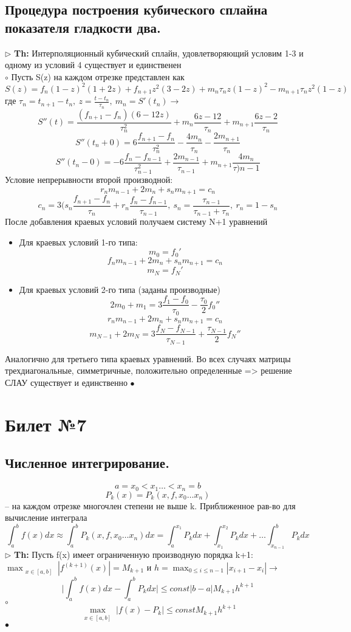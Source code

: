 \documentclass[a4paper]{article}
\begin{document}
\subsection{Процедура построения кубического сплайна показателя гладкости два.}
$\triangleright$ \textbf{Th:} Интерполяционный кубический сплайн, удовлетворяющий условим 1-3 и одному из условий 4 существует и единственен\\
	$\circ$ 
	Пусть S(z) на каждом отрезке представлен как 
	$$ S(z) = f_n(1-z)^2(1+2z) +f_{n+1}z^2(3-2z) + m_n\tau_nz(1-z)^2 -m_{n+1}\tau_nz^2(1-z)$$
	где $\tau_n = t_{n+1}-t_n, \ z = \frac{t-t_n}{\tau_n}, \ m_n = S'(t_n) \rightarrow$
	$$ S''(t) = \frac{(f_{n+1} - f_n)(6-12z)}{\tau_n^2} + m_n \frac{6z-12}{\tau_n} + m_{n+1} \frac{6z-2}{\tau_n}$$
	$$ S''(t_n+0) = 6 \frac{f_{n+1}-f_n}{\tau_n^2} - \frac{4m_n}{\tau_n} - \frac{2m_{n+1}}{\tau_n}$$
	$$ S''(t_n-0) = -6 \frac{f_n-f_{n-1}}{\tau_{n-1}^2} + \frac{2m_{n-1}}{\tau_{n-1}} + m_{n+1}\frac{4m_n}{\tau){n-1}}$$
	Условие непрерывности второй производной:
	$$r_nm_{n-1}+2m_n+s_nm_{n+1}=c_n$$
	$$ c_n=3 \big(s_n\frac{f_{n+1}-f_n}{\tau_n}+r_n\frac{f_n-f_{n-1}}{\tau_{n-1}}, \ s_n=\frac{\tau_{n-1}}{\tau_{n-1}+\tau_n},\ r_n=1-s_n$$
	После добавления краевых условий получаем систему N+1 уравнений
	\begin{itemize}
		\item Для краевых условий 1-го типа:
		$$ m_0=f_0'$$
		$$ f_nm_{n-1} + 2m_n + s_nm_{n+1} = c_n$$
		$$ m_N=f_N'$$
		\item Для краевых условий 2-го типа (заданы производные)
		$$ 2m_0 + m_1 = 3\frac{f_1-f_0}{\tau_0} - \frac{\tau_0}{2}f_0'' $$
		$$ r_nm_{n-1} + 2m_n + s_nm_{n+1} = c_n $$
		$$ m_{N-1} + 2m_N = 3\frac{f_N-f_{N-1}}{\tau_{N-1}} + \frac{\tau_{N-1}}{2}f_N'' $$
	\end{itemize}
	Аналогично для третьего типа краевых уравнений. Во всех случаях матрицы трехдиагональные, симметричные, положительно определенные => решение СЛАУ существует и единственно
	$\bullet$

\section{Билет №7}
\subsection{Численное интегрирование.}
$$a=x_0<x_1\ldots <x_n=b$$
$$P_k(x)=P_k(x,f,x_0 \ldots x_n)$$ – на каждом отрезке многочлен степени не выше k. Приближенное рав-во для вычисление интеграла
$$ \int_{a}^b f(x)dx \approx \int_{a}^b P_k(x,f,x_0 \ldots x_n) dx = \int_{a}^{x_1} P_k dx + \int_{x_1}^{x_2} P_k dx + \ldots \int_{x_{n-1}}^b P_k dx$$
$\triangleright$ \textbf{Th:} Пусть f(x) имеет ограниченную производную порядка k+1: $\max_{\substack{x\in [a,b]}} |f^{(k+1)}(x)|=M_{k+1}$ и $h=\max_{0 \leq i \leq n-1} |x_{i+1} - x_i| \rightarrow$
$$ \big| \int_{a}^b f(x)dx - \int_{a}^b P_k dx \big| \leq const |b-a|M_{k+1}h^{k+1}$$
	$\circ$ 
		$$\max_{\substack{x \in [a,b]}} |f(x)-P_k| \leq const M_{k+1}h^{k+1} $$
	$\bullet$ 
\end{document}
